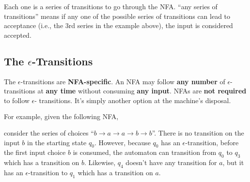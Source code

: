 \documentclass[12pt, letterpaper, oneside]{book}
\begin{document}
Each one is a series of transitions to go through the NFA. ``any series of transitions'' means if any one of the
possible series of transitions can lead to acceptance (i.e., the 3rd series in the example above), the input is
considered accepted.

\subsection{The \texorpdfstring{$\epsilon$}{}-Transitions}

The $\epsilon$-transitions are \textbf{NFA-specific}. An NFA may follow \textbf{any number} of $\epsilon$-transitions
at \textbf{any time} without consuming \textbf{any input}. NFAs are \textbf{not required} to follow $\epsilon$-
transitions. It's simply another option at the machine's disposal.

For example, given the following NFA,


consider the series of choices ``$b \rightarrow a \rightarrow a \rightarrow b \rightarrow b$''. There is no transition
on the input $b$ in the starting state $q_0$. However, because $q_0$ has an $\epsilon$-transition, before the first
input choice $b$ is consumed, the automaton can transition from $q_0$ to $q_3$ which has a transition on $b$. Likewise,
$q_4$ doesn't have any transition for $a$, but it has an $\epsilon$-transition to $q_1$ which has a transition on $a$.
\end{document}
